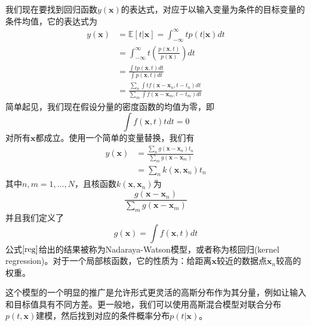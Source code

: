 我们现在要找到回归函数$y(\boldsymbol{x})$的表达式，对应于以输入变量为条件的目标变量的条件均值，它的表达式为
\begin{equation}
\begin{aligned}
	y(\boldsymbol{x})&=\mathbb{E}[t|\boldsymbol{x}]=\int_{-\infty}^{\infty}tp(t|\boldsymbol{x})dt\\
	&=\int _{-\infty}^{\infty} t\left(\frac{p(\boldsymbol{x},t)}{p(\boldsymbol{x})} \right)dt\\
	&=\frac{\int tp(\boldsymbol{x},t)dt}{\int p(\boldsymbol{x},t)dt}\\
	&=\frac{\sum_{n}\int tf(\boldsymbol{x}-\boldsymbol{x}_n,t-t_n)dt }{\sum_{m}\int f(\boldsymbol{x}-\boldsymbol{x}_m,t-t_m)dt}
\end{aligned}
\end{equation}
简单起见，我们现在假设分量的密度函数的均值为零，即
\begin{equation}
	\int f(\boldsymbol{x},t)tdt=0
\end{equation}
对所有$\boldsymbol{x}$都成立。使用一个简单的变量替换，我们有
\begin{equation}
\label{reg}
\begin{aligned}
	y(\boldsymbol{x})&=\frac{\sum_n g(\boldsymbol{x}-\boldsymbol{x}_n)t_n}{\sum_m g(\boldsymbol{x}-\boldsymbol{x}_m)}\\
	&=\sum_nk(\boldsymbol{x},\boldsymbol{x}_n)t_n
\end{aligned}
\end{equation}
其中$n,m=1,\dots,N$，且核函数$k(\boldsymbol{x},\boldsymbol{x}_n)$为
\begin{equation}
	\frac{ g(\boldsymbol{x}-\boldsymbol{x}_n)}{\sum_m g(\boldsymbol{x}-\boldsymbol{x}_m)}
\end{equation}
并且我们定义了
\begin{equation}
	g(\boldsymbol{x})=\int f(\boldsymbol{x},t)dt
\end{equation}
公式$\ref{reg}$给出的结果被称为Nadaraya-Watson模型，或者称为核回归(kernel regression)。对于一个局部核函数，它的性质为：给距离$\boldsymbol{x}$较近的数据点$\boldsymbol{x}_n$较高的权重。

这个模型的一个明显的推广是允许形式更灵活的高斯分布作为其分量，例如让输入和目标值具有不同方差。更一般地，我们可以使用高斯混合模型对联合分布$p(t,\boldsymbol{x})$建模，然后找到对应的条件概率分布$p(t|\boldsymbol{x})$。